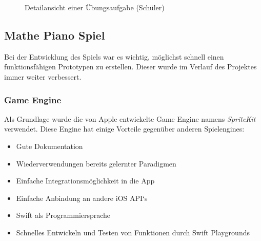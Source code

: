 \begin{figure}[H]
	\centering
	\caption{Detailansicht einer Übungsaufgabe (Schüler)}
	\label{Detailansicht einer Uebungsaufgabe}
\end{figure}

\subsection{Mathe Piano Spiel}
Bei der Entwicklung des Spiels war es wichtig, möglichst schnell einen funktionsfähigen Prototypen zu erstellen. Dieser wurde im Verlauf des Projektes immer weiter verbessert.


\subsubsection{Game Engine}
Als Grundlage wurde die von Apple entwickelte Game Engine namens \textit{SpriteKit} verwendet. Diese Engine hat einige Vorteile gegenüber anderen Spielengines:
\begin{itemize}
\item Gute Dokumentation
\item Wiederverwendungen bereits gelernter Paradigmen    
\item Einfache Integrationsmöglichkeit in die App
\item Einfache Anbindung an andere iOS API‘s
\item Swift als Programmiersprache 
\item Schnelles Entwickeln und Testen von Funktionen durch Swift Playgrounds
\end{itemize}

